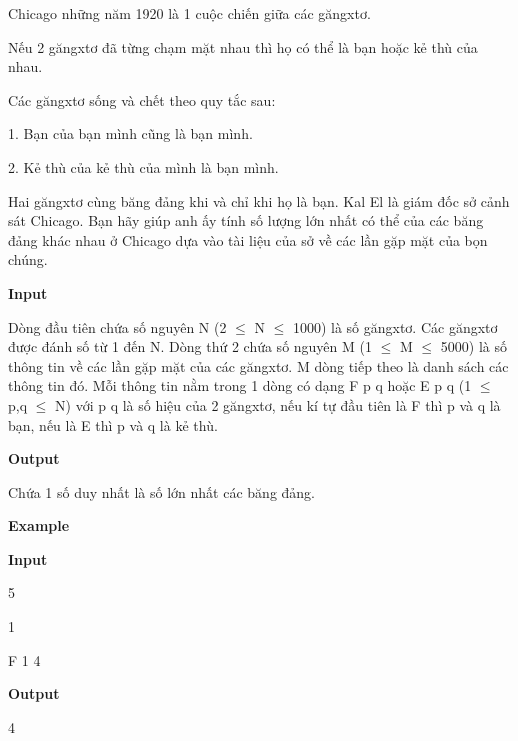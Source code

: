 



    Chicago những năm 1920 là 1 cuộc chiến giữa các găngxtơ.   

      Nếu 2 găngxtơ đã từng chạm mặt nhau thì họ có thể là bạn hoặc kẻ thù của nhau.     

      Các găngxtơ sống và chết theo quy tắc sau:     

      1. Bạn của bạn mình cũng là bạn mình.     

      2. Kẻ thù của kẻ thù của mình là bạn mình.     

      Hai găngxtơ cùng băng đảng khi và chỉ khi họ là bạn. Kal El là giám đốc sở cảnh sát Chicago. Bạn hãy giúp anh ấy tính số lượng lớn nhất có thể của các băng đảng khác nhau ở Chicago dựa vào tài liệu của sở về các lần gặp mặt của bọn chúng.     

\textbf{       Input      }

      Dòng đầu tiên chứa số nguyên N (2 $\le$ N $\le$ 1000) là số găngxtơ. Các găngxtơ được đánh số từ 1 đến N. Dòng thứ 2 chứa số nguyên M (1 $\le$ M $\le$ 5000) là số thông tin về các lần gặp mặt của các găngxtơ. M dòng tiếp theo là danh sách các thông tin đó. Mỗi thông tin nằm trong 1 dòng có dạng F p q hoặc E p q (1 $\le$ p,q $\le$ N) với p q là số hiệu của 2 găngxtơ, nếu kí tự đầu tiên là F thì p và q là bạn, nếu là E thì p và q là kẻ thù.     

\textbf{       Output      }

      Chứa 1 số duy nhất là số lớn nhất các băng đảng.     

\textbf{       Example      }

\textbf{       Input      }

      5     

      1     

      F 1 4     

\textbf{       Output      }

      4      
\\
